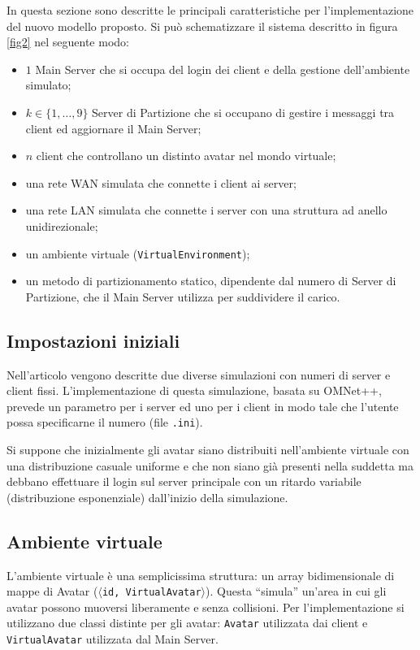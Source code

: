 \documentclass[a4paper, 11pt, oneside]{book}
\theoremstyle{definition}
\theoremstyle{remark}
\begin{document}
In questa sezione sono descritte le principali caratteristiche per
l'implementazione del nuovo modello proposto. Si può schematizzare il
sistema descritto in figura \ref{fig2} nel seguente modo:
\begin{itemize}
\item
$1$ Main Server che si occupa del login dei client e della gestione
dell'ambiente simulato;
\item
$k \in \{1, \ldots, 9\}$ Server di Partizione che si occupano di gestire i
messaggi tra client ed aggiornare il Main Server;
\item
$n$ client che controllano un distinto avatar nel mondo virtuale;
\item
una rete WAN simulata che connette i client ai server;
\item
una rete LAN simulata che connette i server con una struttura ad anello
unidirezionale;
\item
un ambiente virtuale (\texttt{VirtualEnvironment});
\item
un metodo di partizionamento statico, dipendente dal numero di Server di
Partizione, che il Main Server utilizza per suddividere il carico.
\end{itemize}

\subsection{Impostazioni iniziali}
Nell'articolo vengono descritte due diverse simulazioni con numeri di server
e client fissi. L'implementazione di questa simulazione, basata su OMNet++,
prevede un parametro per i server ed uno per i client in modo tale che l'utente
possa specificarne il numero (file \texttt{.ini}).

Si suppone che inizialmente gli avatar siano distribuiti nell'ambiente virtuale
con una distribuzione casuale uniforme e che non siano già presenti nella
suddetta ma debbano effettuare il login sul server principale con un ritardo
variabile (distribuzione esponenziale) dall'inizio della simulazione.

\subsection{Ambiente virtuale}
L'ambiente virtuale è una semplicissima struttura: un array
bidimensionale di mappe di Avatar
(\texttt{$\langle$id, VirtualAvatar$\rangle$}).
Questa ``simula'' un'area in cui gli avatar possono muoversi liberamente e
senza collisioni. Per l'implementazione si utilizzano due classi distinte
per gli avatar: \texttt{Avatar} utilizzata dai client e
\texttt{VirtualAvatar} utilizzata dal Main Server.
\end{document}
